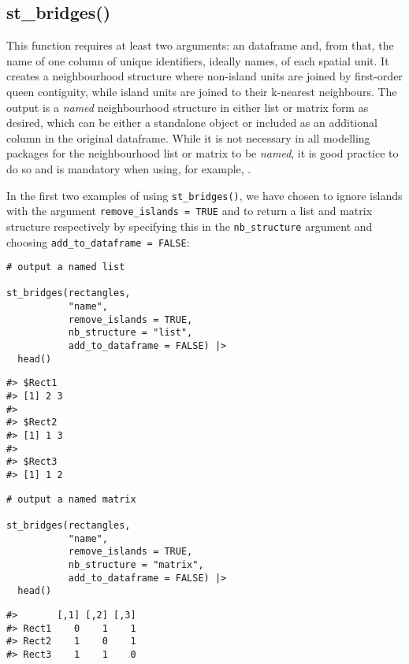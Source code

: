 \hypertarget{st_bridges}{%
\subsection{st\_bridges()}\label{st_bridges}}

This function requires at least two arguments: an  dataframe and, from that, the name of one column of unique identifiers, ideally names, of each spatial unit. It creates a neighbourhood structure where non-island units are joined by first-order queen contiguity, while island units are joined to their k-nearest neighbours. The output is a \emph{named} neighbourhood structure in either list or matrix form as desired, which can be either a standalone object or included as an additional column in the original  dataframe. While it is not necessary in all modelling packages for the neighbourhood list or matrix to be \emph{named}, it is good practice to do so and is mandatory when using, for example, .

In the first two examples of using \texttt{st\_bridges()}, we have chosen to ignore islands with the argument \texttt{remove\_islands\ =\ TRUE} and to return a list and matrix structure respectively by specifying this in the \texttt{nb\_structure} argument and choosing \texttt{add\_to\_dataframe\ =\ FALSE}:

\begin{verbatim}
# output a named list

st_bridges(rectangles, 
           "name", 
           remove_islands = TRUE, 
           nb_structure = "list", 
           add_to_dataframe = FALSE) |>
  head()
\end{verbatim}

\begin{verbatim}
#> $Rect1
#> [1] 2 3
#> 
#> $Rect2
#> [1] 1 3
#> 
#> $Rect3
#> [1] 1 2
\end{verbatim}

\begin{verbatim}
# output a named matrix

st_bridges(rectangles, 
           "name", 
           remove_islands = TRUE, 
           nb_structure = "matrix", 
           add_to_dataframe = FALSE) |> 
  head()
\end{verbatim}

\begin{verbatim}
#>       [,1] [,2] [,3]
#> Rect1    0    1    1
#> Rect2    1    0    1
#> Rect3    1    1    0
\end{verbatim}

